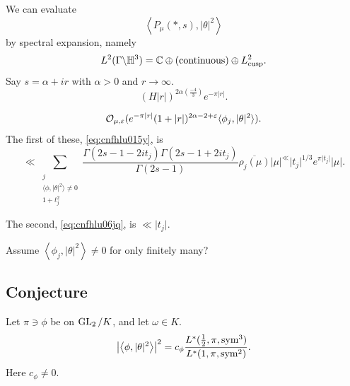 \documentclass[reqno]{amsart} 
\begin{document}
We can evaluate
\begin{equation*}
  \left\langle P_\mu(\ast, s) , \lvert \theta  \rvert^2 \right\rangle
\end{equation*}
by spectral expansion, namely
\begin{equation*}
  L^2(\Gamma \backslash \mathbb{H}^3)
  = \mathbb{C} \oplus(\text{continuous}) \oplus L^2_{\operatorname{cusp}}.  
\end{equation*}
Say $s = \alpha + i r$ with $\alpha > 0$ and $r \rightarrow \infty$.
\begin{equation}\label{eq:cnfhlu015y}
  (H \lvert r \rvert)^{2 \alpha \left( \frac{- 4 }{3} \right)}
  e^{- \pi \lvert r \rvert}.
\end{equation}

\begin{equation}\label{eq:cnfhlu06jq}
  \mathcal{O}_{\mu, \varepsilon }(e^{- \pi \lvert r \rvert}(1 + \lvert r \rvert)^{2 \alpha - 2 + \varepsilon} \langle \phi_j, \lvert \theta  \rvert^2  \rangle).
\end{equation}
The first of these, \eqref{eq:cnfhlu015y}, is
\begin{equation*}
  \ll \sum_{
    \substack{
      j  \\
      \langle \phi, \lvert \theta  \rvert^2  \rangle \neq 0 \\
      1 + t_j^2
    }
  }
  \frac{\Gamma(2 s - 1 - 2 i t_j ) \Gamma(2 s - 1 + 2 i t_j )}{ \Gamma(2 s - 1)}
  \overline{\rho_j(\mu )} \lvert \mu \rvert^
  \ll \lvert t_j  \rvert^{1/3} e^{\pi \lvert t_j  \rvert} \lvert \mu  \rvert.
\end{equation*}

The second, \eqref{eq:cnfhlu06jq}, is $\ll \lvert t_j \rvert$.

Assume $\left\langle \phi_j, \lvert \theta  \rvert^2 \right\rangle \neq 0$ for only finitely many?


\subsection{Conjecture}\label{sec:cnfhlu7t9k}
Let $\pi \ni \phi$ be on $\operatorname{GL}_2 / K$, and let $\omega \in K$.
\begin{equation*}
  \left\lvert \left\langle \phi, \lvert \theta  \rvert^2 \right\rangle \right\rvert^2
  = c_\phi
  \frac{L^\ast(\tfrac{1}{2}, \pi, \operatorname{sym}^3)}{L^\ast(1, \pi, \operatorname{sym}^2)}.
\end{equation*}
Here $c_\phi \neq 0$.
\end{document}
